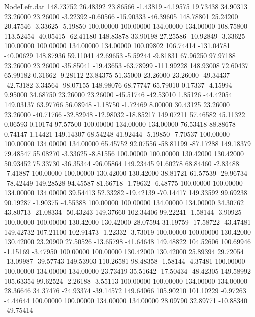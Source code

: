 \begin{filecontents}{NodeLeft.dat}
 148.73752   26.48392   23.86566    -1.43819   -4.19575   19.73438   34.90313   23.26000   23.26000   -3.22392   -0.60566  -15.90333  -46.39605
 148.78801   25.24200   20.47546    -3.33625   -5.19850  100.00000  100.00000  134.00000  134.00000  108.75800  113.52454  -40.05415  -62.41180
 148.83878   33.90198   27.25586   -10.92849   -3.33625  100.00000  100.00000  134.00000  134.00000  100.09802  106.74414 -131.04781  -40.00629
 148.87936   59.11041   42.69653    -5.59244   -9.81831   67.96250   97.97188   23.26000   23.26000  -35.85041  -19.43653  -63.78999 -111.99228
 148.93008   72.60437   65.99182     0.31662   -9.28112   23.84375   51.35000   23.26000   23.26000  -49.34437  -42.73182    3.34564  -98.07155
 148.98076   68.77747   65.79010     0.17337   -4.15994    9.95000   34.68750   23.26000   23.26000  -45.51746  -42.53010    1.85126  -44.42054
 149.03137   63.97766   56.08948    -1.18750   -1.72469    8.00000   30.43125   23.26000   23.26000  -40.71766  -32.82948  -12.98032  -18.85217
 149.07211   57.46582   45.11322     0.06593    0.10174   97.57500  100.00000  134.00000  134.00000   76.53418   88.88678    0.74147    1.14421
 149.14307   68.54248   41.92444    -5.19850   -7.70537  100.00000  100.00000  134.00000  134.00000   65.45752   92.07556  -58.81199  -87.17288
 149.18379   79.48547   55.08270    -3.33625   -8.81556  100.00000  100.00000  130.42000  130.42000   50.93452   75.33730  -36.35344  -96.05864
 149.23445   91.60278   68.84460    -2.83488   -7.41887  100.00000  100.00000  130.42000  130.42000   38.81721   61.57539  -29.96734  -78.42449
 149.28528   94.45587   81.66718    -1.79632   -6.48775  100.00000  100.00000  134.00000  134.00000   39.54413   52.33282  -19.42139  -70.14417
 149.33592   99.69238   90.19287    -1.90375   -4.55388  100.00000  100.00000  134.00000  134.00000   34.30762   43.80713  -21.08334  -50.43243
 149.37660  102.34406   99.22241    -1.58144   -3.90925  100.00000  100.00000  130.42000  130.42000   28.07594   31.19759  -17.58722  -43.47481
 149.42732  107.21100  102.91473    -1.22332   -3.73019  100.00000  100.00000  130.42000  130.42000   23.20900   27.50526  -13.65798  -41.64648
 149.48822  104.52606  100.69946    -1.15169   -3.47950  100.00000  100.00000  130.42000  130.42000   25.89394   29.72054  -13.09987  -39.57743
 149.53903  110.26581   98.48358    -1.58144   -4.37481  100.00000  100.00000  134.00000  134.00000   23.73419   35.51642  -17.50434  -48.42305
 149.58992  105.63354   99.62524    -2.26188   -3.55113  100.00000  100.00000  134.00000  134.00000   28.36646   34.37476  -24.93374  -39.14572
 149.64066  105.90210  101.10229    -0.97263   -4.44644  100.00000  100.00000  134.00000  134.00000   28.09790   32.89771  -10.88340  -49.75414

\end{filecontents}
